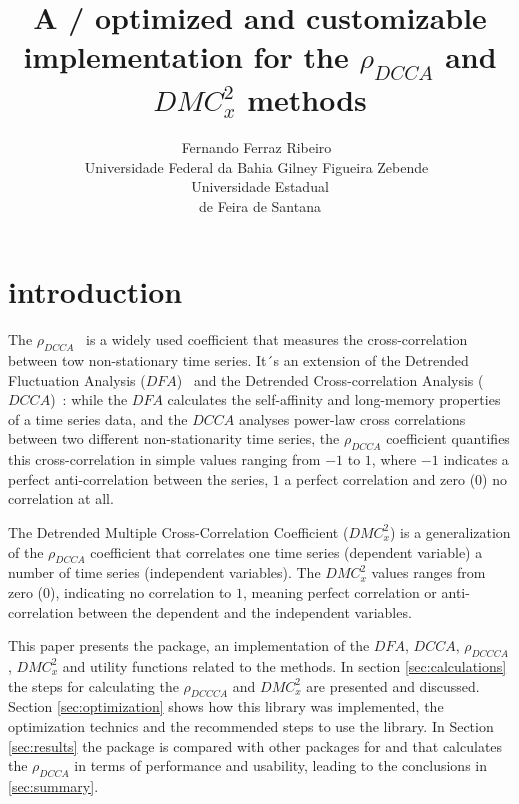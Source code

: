 \documentclass[article]{jss}
\author{Fernando Ferraz Ribeiro~\orcidlink{0000-0002-0685-4774}\\Universidade Federal da Bahia
   \And Gilney Figueira Zebende~\orcidlink{0000-0003-2420-9805}\\Universidade Estadual\\de Feira de Santana}
\title{A \proglang{Python}/\proglang{Zig} optimized and customizable implementation for the $\rho_{DCCA}$ and $DMC_x^2$ methods}
\begin{document}


\section{introduction} \label{sec:intro}

The $\rho_{DCCA}$~\citep{Zebende2011} is a widely used coefficient that measures the cross-correlation between tow non-stationary time series. It´s an extension of the Detrended Fluctuation Analysis ($DFA$)~\citep{Peng_1994} and the Detrended Cross-correlation Analysis ($DCCA$)~\citep{Podobnik2008}: while the $DFA$ calculates the self-affinity and long-memory properties of a time series data, and the $DCCA$ analyses power-law cross correlations between two different non-stationarity time series, the $\rho_{DCCA}$ coefficient quantifies this cross-correlation in simple values ranging from $-1$ to $1$, where $-1$ indicates a perfect anti-correlation between the series, $1$ a perfect correlation and zero ($0$) no correlation at all.



The Detrended Multiple Cross-Correlation Coefficient \citep{Zebende2018} ($DMC_x^2$) is a generalization of the $\rho_{DCCA}$ coefficient that correlates one time series (dependent variable) a number of time series (independent variables). The $DMC_x^2$ values ranges from zero ($0$), indicating no correlation to $1$, meaning perfect correlation or anti-correlation between the dependent and the independent variables.

This paper presents the   package, an implementation of the $DFA$, $DCCA$, $\rho_{DCCCA}$, $DMC_x^2$ and utility functions related to the methods. In section \ref{sec:calculations} the steps for calculating the $\rho_{DCCCA}$ and $DMC_x^2$ are presented and discussed. Section \ref{sec:optimization} shows how this library was implemented, the optimization technics and the recommended steps to use the library. In Section \ref{sec:results} the  package is compared with other packages for  and  that calculates the $\rho_{DCCA}$ in terms of performance and usability, leading to the conclusions in \ref{sec:summary}.
\end{document}
